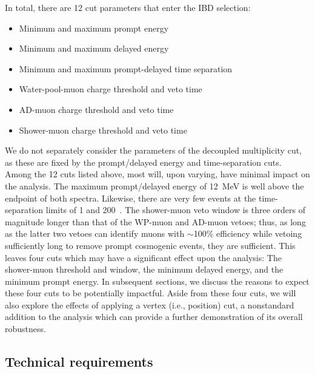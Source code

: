 \documentclass[../thesis.tex]{subfiles}
\begin{document}
In total, there are 12 cut parameters that enter the IBD selection:

\begin{itemize}
\item Minimum and maximum prompt energy
\item Minimum and maximum delayed energy
\item Minimum and maximum prompt-delayed time separation
\item Water-pool-muon charge threshold and veto time
\item AD-muon charge threshold and veto time
\item Shower-muon charge threshold and veto time
\end{itemize}

We do not separately consider the parameters of the decoupled multiplicity cut, as these are fixed by the prompt/delayed energy and time-separation cuts. Among the 12 cuts listed above, most will, upon varying, have minimal impact on the analysis. The maximum prompt/delayed energy of 12~MeV is well above the endpoint of both spectra. Likewise, there are very few events at the time-separation limits of 1 and 200~\us. The shower-muon veto window is three orders of magnitude longer than that of the WP-muon and AD-muon vetoes; thus, as long as the latter two vetoes can identify muons with $\sim$100\% efficiency while vetoing sufficiently long to remove prompt cosmogenic events, they are sufficient. This leaves four cuts which may have a significant effect upon the analysis: The shower-muon threshold and window, the minimum delayed energy, and the minimum prompt energy. In subsequent sections, we discuss the reasons to expect these four cuts to be potentially impactful. Aside from these four cuts, we will also explore the effects of applying a vertex (i.e., position) cut, a nonstandard addition to the analysis which can provide a further demonstration of its overall robustness.

\subsection{Technical requirements}
\label{sec:cutVaryTechReq}
\end{document}
